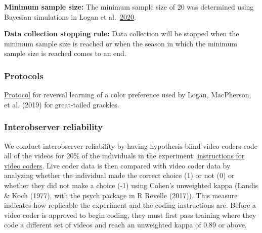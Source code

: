 \documentclass[
]{article}
\begin{document}
\textbf{Minimum sample size:} The minimum sample size of 20 was
determined using Bayesian simulations in Logan et
al.~\href{http://corinalogan.com/Preregistrations/gxpopbehaviorhabitat.html\#Q1:_behavior_across_the_range}{2020}.

\textbf{Data collection stopping rule:} Data collection will be stopped
when the minimum sample size is reached or when the season in which the
minimum sample size is reached comes to an end.

\hypertarget{protocols}{%
\subsubsection{Protocols}\label{protocols}}

\href{https://docs.google.com/document/d/16hKGUNO1SpnXAT8DN_GXb56Aw6WzCraCIUKiP9gVI6o/edit?usp=sharing}{Protocol}
for reversal learning of a color preference used by Logan, MacPherson,
et al. (2019) for great-tailed grackles.

\hypertarget{interobserver-reliability}{%
\subsubsection{Interobserver
reliability}\label{interobserver-reliability}}

We conduct interobserver reliability by having hypothesis-blind video
coders code all of the videos for 20\% of the individuals in the
experiment:
\href{https://docs.google.com/document/d/1QakS8TMe4WRv_QWKrHaWHyJSXbQwl8v9Y061SY914Wg/edit?usp=sharing}{instructions
for video coders}. Live coder data is then compared with video coder
data by analyzing whether the individual made the correct choice (1) or
not (0) or whether they did not make a choice (-1) using Cohen's
unweighted kappa (Landis \& Koch (1977), with the psych package in R
Revelle (2017)). This measure indicates how replicable the experiment
and the coding instructions are. Before a video coder is approved to
begin coding, they must first pass training where they code a different
set of videos and reach an unweighted kappa of 0.89 or above.
\end{document}
